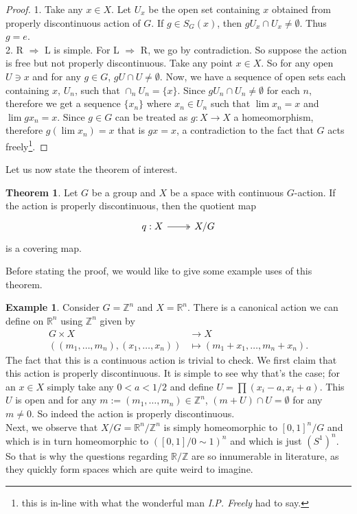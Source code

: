 \documentclass[letterpaper,11pt,twoside]{article}
\theoremstyle{definition}
\theoremstyle{definition}
\newtheorem{theorem}[proposition]{Theorem}
\theoremstyle{definition}
\theoremstyle{definition}
\theoremstyle{definition}
\newtheorem*{example}{\textbf{Example}}
\theoremstyle{definition}
\theoremstyle{remark}
\theoremstyle{definition}
\newcommand{\R}[0]{\mathbb{R}}
\newcommand{\Z}[0]{\mathbb{Z}}
\begin{document}
\begin{proof}
1. Take any $x\in X$. Let $U_x$ be the open set containing $x$ obtained from properly discontinuous action of $G$. If $g\in S_G(x)$, then $gU_x \cap U_x \neq \emptyset$. Thus $g=e$.\\

2. R $\Rightarrow$ L is simple. For L $\Rightarrow$ R, we go by contradiction. So suppose the action is free but not properly discontinuous. Take any point $x\in X$. So for any open $U \ni x$ and for any $g\in G$, $gU \cap U \neq \emptyset$. Now, we have a sequence of open sets each containing $x$, $U_n$, such that $\cap_{n}U_n = \{x\}$. Since $gU_n \cap U_n \neq \emptyset$ for each $n$, therefore we get a sequence $\{x_n\}$ where $x_n \in U_n$ such that $\lim x_n = x$ and $\lim gx_n = x$. Since $g\in G$ can be treated as $g  : X\to X$ a homeomorphism, therefore $g(\lim x_n) = x $ that is $gx = x$, a contradiction to the fact that $G$ acts freely\footnote{this is in-line with what the wonderful man \textit{I.P. Freely} had to say.}.  
\end{proof}
Let us now state the theorem of interest.
\begin{theorem}\label{T-6.0.4} Let $G$ be a group and $X$ be a space with continuous $G$-action. If the action is properly discontinuous, then the quotient map 
\[\begin{tikzcd}
	{q :X} & {X/G}
	\arrow[two heads, from=1-1, to=1-2]
\end{tikzcd}\]
is a covering map.
\end{theorem}
Before stating the proof, we would like to give some example uses of this theorem.
\begin{example}
Consider $G = \mathbb{Z}^n$ and $X = \mathbb{R}^n$. There is a canonical action we can define on $\mathbb{R}^n$ using $\mathbb{Z}^n$ given by 
\begin{align*}
    G\times X &\longrightarrow X\\
    ((m_1,\dots,m_n),(x_1,\dots,x_n)) &\longmapsto (m_1+x_1, \dots, m_n + x_n).
\end{align*}
The fact that this is a continuous action is trivial to check. We first claim that this action is properly discontinuous. It is simple to see why that's the case; for an $x\in X$ simply take any $0<a<1/2$ and define $U = \prod (x_i-a,x_i+a)$. This $U$ is open and for any $m:=(m_1,\dots,m_n)\in \mathbb{Z}^n$, $(m + U )\cap U = \emptyset$ for any $m\neq 0$. So indeed the action is properly discontinuous.\\

Next, we observe that $X/G = \mathbb{R}^n/\mathbb{Z}^n$ is simply homeomorphic to $[0,1]^n/G$ and which is in turn homeomorphic to $\left([0,1]/0\sim 1\right)^n$ and which is just $(S^1)^n$. So that is why the questions regarding $\R/\Z$ are so innumerable in literature, as they quickly form spaces which are quite weird to imagine. 
\end{example}
\end{document}
